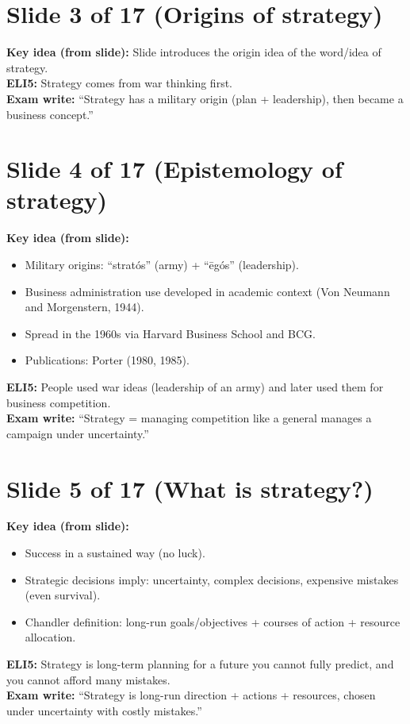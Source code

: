 \documentclass[11pt,a4paper]{article}
\begin{document}
\section*{Slide 3 of 17 (Origins of strategy)}
\textbf{Key idea (from slide):} Slide introduces the origin idea of the word/idea of strategy.\\
\textbf{ELI5:} Strategy comes from war thinking first.\\
\textbf{Exam write:} ``Strategy has a military origin (plan + leadership), then became a business concept.''

\section*{Slide 4 of 17 (Epistemology of strategy)}
\textbf{Key idea (from slide):}
\begin{itemize}
  \item Military origins: ``stratós'' (army) + ``ēgós'' (leadership).
  \item Business administration use developed in academic context (Von Neumann and Morgenstern, 1944).
  \item Spread in the 1960s via Harvard Business School and BCG.
  \item Publications: Porter (1980, 1985).
\end{itemize}
\textbf{ELI5:} People used war ideas (leadership of an army) and later used them for business competition.\\
\textbf{Exam write:} ``Strategy = managing competition like a general manages a campaign under uncertainty.''

\section*{Slide 5 of 17 (What is strategy?)}
\textbf{Key idea (from slide):}
\begin{itemize}
  \item Success in a sustained way (no luck).
  \item Strategic decisions imply: uncertainty, complex decisions, expensive mistakes (even survival).
  \item Chandler definition: long-run goals/objectives + courses of action + resource allocation.
\end{itemize}
\textbf{ELI5:} Strategy is long-term planning for a future you cannot fully predict, and you cannot afford many mistakes.\\
\textbf{Exam write:} ``Strategy is long-run direction + actions + resources, chosen under uncertainty with costly mistakes.''
\end{document}
